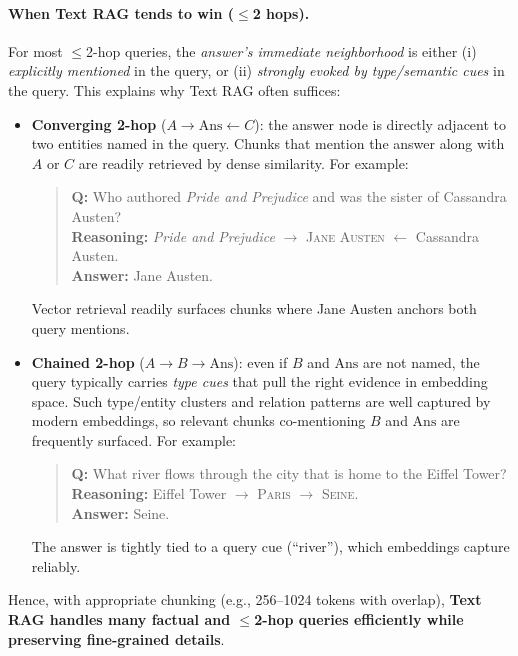 \documentclass{article}
\theoremstyle{plain}
\theoremstyle{definition}
\theoremstyle{remark}
\begin{document}
\paragraph{When Text RAG tends to win (\texorpdfstring{$\le$}{<=}2 hops).}
For most $\le$2-hop queries, the \emph{answer's immediate neighborhood} is either (i) \emph{explicitly mentioned} in the query, or (ii) \emph{strongly evoked by type/semantic cues} in the query. This explains why Text RAG often suffices:
\begin{itemize}
  \item \textbf{Converging 2-hop} ($A \rightarrow \mathrm{Ans} \leftarrow C$): the answer node is directly adjacent to two entities named in the query. Chunks that mention the answer along with $A$ or $C$ are readily retrieved by dense similarity. For example:
  \begin{quote}
  \textbf{Q:} Who authored \emph{Pride and Prejudice} and was the sister of Cassandra Austen?\\
  \textbf{Reasoning:} \emph{Pride and Prejudice} $\rightarrow$ \textsc{Jane Austen} $\leftarrow$ Cassandra Austen.\\
  \textbf{Answer:} Jane Austen.
  \end{quote}
  Vector retrieval readily surfaces chunks where Jane Austen anchors both query mentions.
  
  \item \textbf{Chained 2-hop} ($A \rightarrow B \rightarrow \mathrm{Ans}$): even if $B$ and $\mathrm{Ans}$ are not named, the query typically carries \emph{type cues} that pull the right evidence in embedding space. Such type/entity clusters and relation patterns are well captured by modern embeddings, so relevant chunks co-mentioning $B$ and $\mathrm{Ans}$ are frequently surfaced. For example:
  \begin{quote}
  \textbf{Q:} What river flows through the city that is home to the Eiffel Tower?\\
  \textbf{Reasoning:} Eiffel Tower $\rightarrow$ \textsc{Paris} $\rightarrow$ \textsc{Seine}.\\
  \textbf{Answer:} Seine.
  \end{quote}
  The answer is tightly tied to a query cue (``river''), which embeddings capture reliably.
\end{itemize}
Hence, with appropriate chunking (e.g., 256--1024 tokens with overlap), \textbf{Text RAG handles many factual and $\le$2-hop queries efficiently while preserving fine-grained details}.
\end{document}
